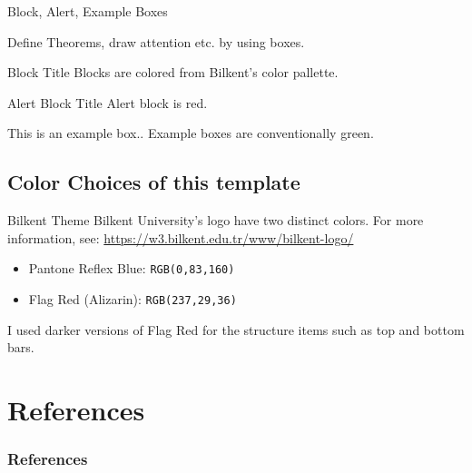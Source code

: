 \documentclass{beamer}
\begin{document}
\begin{frame}{Block, Alert, Example Boxes}

    Define Theorems, draw attention etc. by using boxes.
        
    \begin{block}{Block Title}
        Blocks are colored from Bilkent's color pallette.
    \end{block}
    
    \begin{alertblock}{Alert Block Title}
        Alert block is red.
    \end{alertblock}
    
    \begin{examples}
        This is an example box.. Example boxes are conventionally green.
    \end{examples}
\end{frame}

\subsection{Color Choices of this template}

\begin{frame}{Bilkent Theme}
    Bilkent University's logo have two distinct colors. For more information, see: \url{https://w3.bilkent.edu.tr/www/bilkent-logo/}
    
    \begin{itemize}
        \item Pantone Reflex Blue: \texttt{RGB(0,83,160)}
        \item Flag Red (Alizarin): \texttt{RGB(237,29,36)}
    \end{itemize}
    
    I used darker versions of Flag Red for the structure items such as top and bottom bars.
\end{frame}


\begin{frame}{}

\end{frame}

\section{References}
\begingroup
\Tiny
\begin{frame}[allowframebreaks]
    \frametitle{References}
    
     
\end{frame}
\endgroup
\end{document}

